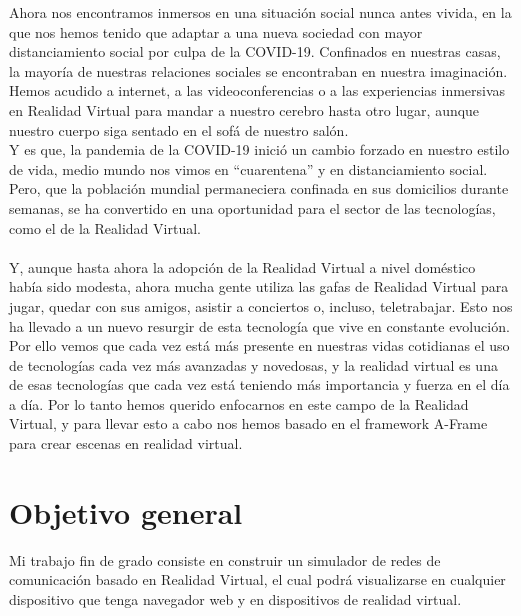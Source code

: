 \documentclass[a4paper, 12pt]{book}
\begin{document}
Ahora nos encontramos inmersos en una situación social nunca antes vivida, en la que nos hemos tenido que adaptar a una nueva sociedad con mayor distanciamiento social por culpa de la COVID-19.
\newpage
Confinados en nuestras casas, la mayoría de nuestras relaciones sociales se encontraban en nuestra imaginación. Hemos acudido a internet, a las videoconferencias o a las experiencias inmersivas en Realidad Virtual para mandar a nuestro cerebro hasta otro lugar, aunque nuestro cuerpo siga sentado en el sofá de nuestro salón.\\
Y es que, la pandemia de la COVID-19 inició un cambio forzado en nuestro estilo de vida, medio mundo nos vimos en “cuarentena” y en distanciamiento social. Pero, que la población mundial permaneciera confinada en sus domicilios durante semanas, se ha convertido en una oportunidad para el sector de las tecnologías, como el de la Realidad Virtual.\\
\\
Y, aunque hasta ahora la adopción de la Realidad Virtual a nivel doméstico había sido modesta, ahora mucha gente utiliza las gafas de Realidad Virtual para jugar, quedar con sus amigos, asistir a conciertos o, incluso, teletrabajar. Esto nos ha llevado a un nuevo resurgir de esta tecnología que vive en constante evolución.\\
Por ello vemos que cada vez está más presente en nuestras vidas cotidianas el uso de tecnologías cada vez más avanzadas y novedosas, y la realidad virtual es una de esas tecnologías que cada vez está teniendo más importancia y fuerza en el día a día.
Por lo tanto hemos querido enfocarnos en este campo de la Realidad Virtual, y para llevar esto a cabo nos hemos basado en el framework A-Frame para crear escenas en realidad virtual.



\section{Objetivo general} %
\label{sec:objetivo-general} %

Mi trabajo fin de grado consiste en construir un simulador de redes de comunicación basado en Realidad Virtual, el cual podrá visualizarse en cualquier dispositivo que tenga navegador web y en dispositivos de realidad virtual.
\end{document}
